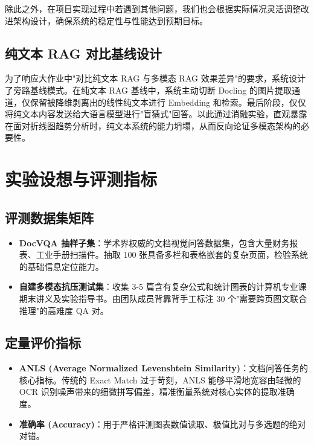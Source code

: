 ﻿\documentclass[UTF8, heading=true]{ctexart}
\begin{document}
除此之外，在项目实现过程中若遇到其他问题，我们也会根据实际情况灵活调整改进架构设计，确保系统的稳定性与性能达到预期目标。

\subsection{纯文本 RAG 对比基线设计}

为了响应大作业中"对比纯文本 RAG 与多模态 RAG 效果差异"的要求，系统设计了旁路基线模式。在纯文本 RAG 基线中，系统主动切断 Docling 的图片提取通道，仅保留被降维剥离出的线性纯文本进行 Embedding 和检索。最后阶段，仅仅将纯文本内容发送给大语言模型进行"盲猜式"回答。以此通过消融实验，直观暴露在面对折线图趋势分析时，纯文本系统的能力坍塌，从而反向论证多模态架构的必要性。

\section{实验设想与评测指标}

\subsection{评测数据集矩阵}

\begin{itemize}
    \item \textbf{DocVQA 抽样子集}：学术界权威的文档视觉问答数据集，包含大量财务报表、工业手册扫描件。抽取 100 张具备多栏和表格嵌套的复杂页面，检验系统的基础信息定位能力。
    \item \textbf{自建多模态抗压测试集}：收集 3-5 篇含有复杂公式和统计图表的计算机专业课期末讲义及实验指导书。由团队成员背靠背手工标注 30 个"需要跨页图文联合推理"的高难度 QA 对。
\end{itemize}

\subsection{定量评价指标}

\begin{itemize}
    \item \textbf{ANLS (Average Normalized Levenshtein Similarity)}：文档问答任务的核心指标。传统的 Exact Match 过于苛刻，ANLS 能够平滑地宽容由轻微的 OCR 识别噪声带来的细微拼写偏差，精准衡量系统对核心实体的提取准确度。
    \item \textbf{准确率 (Accuracy)}：用于严格评测图表数值读取、极值比对与多选题的绝对对错。
\end{itemize}
\end{document}
